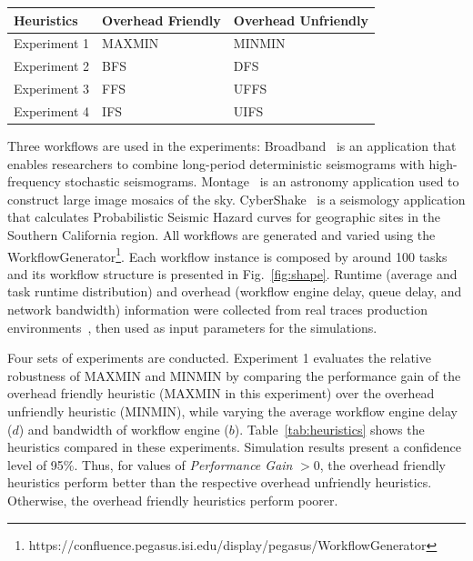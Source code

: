 \documentclass[final]{IEEEtran}
\begin{document}
\begin{center}
  \begin{tabular}{ l|l|l}
    \hline
Heuristics & Overhead Friendly & Overhead Unfriendly \\ \hline
    Experiment 1 & MAXMIN & MINMIN \\ \hline
   Experiment 2 & BFS & DFS \\ \hline
 Experiment 3 & FFS & UFFS \\ \hline
Experiment 4 & IFS & UIFS\\
    \hline
  \end{tabular}
\label{tab:heuristics}
\end{center}

Three workflows are used in the experiments: Broadband~\cite{Broadband} is an application that enables researchers to combine long-period deterministic seismograms with high-frequency stochastic seismograms. Montage~\cite{} is an astronomy application used to construct large image mosaics of the sky. CyberShake~\cite{} is a seismology application that calculates Probabilistic Seismic Hazard curves for geographic sites in the Southern California region. All workflows are generated and varied using the WorkflowGenerator\footnote[1]{https://confluence.pegasus.isi.edu/display/pegasus/WorkflowGenerator}. Each workflow instance is composed by around 100 tasks and its workflow structure is presented in Fig.~\ref{fig:shape}. Runtime (average and task runtime distribution) and overhead (workflow engine delay, queue delay, and network bandwidth) information were collected from real traces production environments~\cite{Chen, Juve2013}, then used as input parameters for the simulations.




Four sets of experiments are conducted. Experiment 1 evaluates the relative robustness of MAXMIN and MINMIN by comparing the performance gain of the overhead friendly heuristic (MAXMIN in this experiment) over the overhead unfriendly heuristic (MINMIN), while varying the average workflow engine delay ($d$) and bandwidth of workflow engine ($b$). Table~\ref{tab:heuristics} shows the heuristics compared in these experiments. Simulation results present a confidence level of 95\%. Thus, for values of \emph{Performance Gain} $> 0$, the overhead friendly heuristics perform better than the respective overhead unfriendly heuristics. Otherwise, the overhead friendly heuristics perform poorer.
\end{document}
